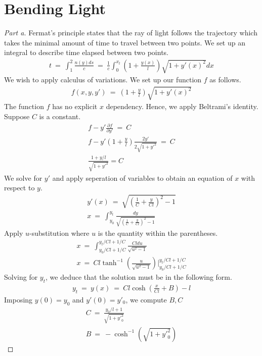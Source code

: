\documentclass{article}
\numberwithin{equation}{section}
\newcommand{\pderiv}[2]{
\frac {\partial {#1} } {\partial {#2}}
}
\begin{document}
\section{Bending Light}
\begin{proof}[Part a]
    Fermat's principle states that the ray of light follows 
    the trajectory which takes the minimal amount of time to 
    travel between two points. We set up an integral to describe 
    time elapsed between two points. 
    \begin{align}
        t \ = \ \int_1^2 \frac {n(y) ds}c \ = \ 
        \frac 1 c \int_{0}^{x_t} \left(1 + \frac {y(x)} l\right)
        \sqrt{1 + y'(x)^2} dx
    \end{align}
    We wish to apply calculus of variations. We set up our function 
    $f$ as follows. 
    \begin{align}
        f(x, y, y') \ = \ \left(1 + \frac y l\right) \sqrt{1 + y'(x)^2}
    \end{align}
    The function $f$ has no explicit $x$ dependency. Hence, we apply 
    Beltrami's identity. Suppose $C$ is a constant. 
    \begin{align}
        f - y' \pderiv f {y'} \ = \ C \\ 
        f - y' \left(1 + \frac y l \right) \frac {2 y'} {2 \sqrt{1 + y'^2}} \ = \ C \\ 
        \frac {1 + y/l}{\sqrt{1 + y'^2}} = C
    \end{align}
    We solve for $y'$ and apply seperation of variables to obtain an equation 
    of $x$ with respect to $y$. 
    \begin{align}
        y'(x) \ = \ \sqrt{
            \left(
                \frac 1 C + \frac y {Cl}
            \right)^2 - 1
        } \\ 
        x \ = \ \int_{y_0}^{y_t} \frac {dy} {\sqrt{
            \left(
                \frac 1 C + \frac y {Cl}
            \right)^2 - 1}}
    \end{align}
    Apply $u$-substitution where $u$ is the quantity within the parentheses. 
    \begin{align}
        x \ = \ \int_{y_0/Cl + 1/C}^{y_t/Cl + 1/C} \frac {Cl du} {\sqrt{u^2 - 1}} 
        \\ 
       x \ = \ Cl \tanh^{-1}\left(
            \frac {u} {\sqrt{u^2 - 1}}
        \right) \bigg|_{y_0/Cl + 1/C}^{y_t/Cl + 1/C}
    \end{align}
    Solving for $y_t$, we deduce that the solution must be in the following form. 
    \begin{align}
        \boxed{
        y_t\ = \ y(x)  \ = \ C l \cosh\left(
            \frac x {Cl} + B
        \right) - l}
    \end{align}
    Imposing $y(0) = y_0$ and $y'(0) = y'_0$, we compute $B, C$
    \begin{align}
        C \ = \ \frac{y_0/l + 1 }{\sqrt{1 + {y'}_0^2}} \\ 
        B \ = \ -\cosh^{-1}\left(\sqrt{1 + {y'}_0^2}\right)
    \end{align}
\end{proof}
\end{document}
